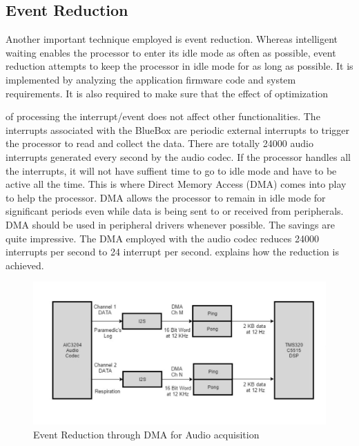 \subsection{Event Reduction}

Another important technique employed is event reduction.  Whereas
intelligent waiting enables the processor to enter its idle mode as
often as possible, event reduction attempts to keep the processor in
idle mode for as long as possible. It is implemented by analyzing the
application firmware code and system requirements. It is also required to make sure that the effect of optimization

of processing the interrupt/event does not affect other functionalities. The interrupts associated with the BlueBox are periodic external interrupts to trigger the processor to
read and collect the data. There are totally 24000 audio interrupts
generated every second by the audio codec. If the processor handles
all the interrupts, it will not have suffient time to go to idle mode
and have to be active all the time. This is where Direct Memory
Access (DMA) comes into play to help the processor.  DMA allows the
processor to remain in idle mode for significant periods even while
data is being sent to or received from peripherals. DMA should be
used in peripheral drivers whenever possible. The savings are quite
impressive. The DMA employed with the audio codec reduces 24000
interrupts per second to 24 interrupt per second.
 explains how the reduction is achieved.

 \begin{figure}
	\centering
	\includegraphics[scale = 0.5 ]{Event_Reduction}
\caption{Event Reduction through DMA for Audio acquisition}
\label{event_reduction}
\end{figure}


